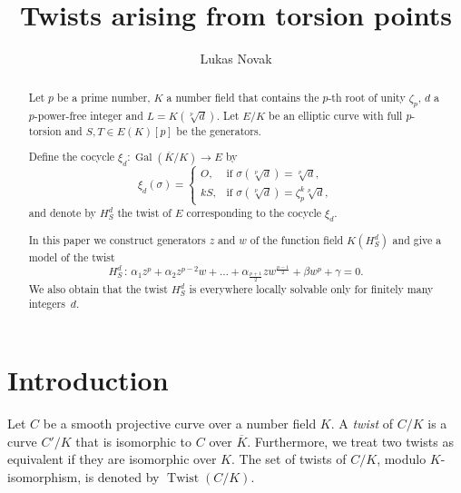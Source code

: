 \documentclass[a4paper, 12pt]{amsart}
\author{Lukas Novak}
\title[Twists arising from torsion points]{Twists arising from torsion points}
\theoremstyle{definition}
\theoremstyle{remark}
\numberwithin{equation}{section}
\begin{document}

\begin{abstract}
    Let $p$ be a prime number, $K$ a number field that contains the $p$-th root of unity $\zeta_p$, $d$ a $p$-power-free integer and $L=K(\sqrt[p]{d})$. Let $E/K$ be an elliptic curve with full $p$-torsion and $S,T \in E(K)[p]$ be the generators. 

    Define the cocycle $\xi_d : \operatorname{Gal}(\overline{K}/K) \to E$ by
    \[
        \xi_d (\sigma)=
        \begin{cases}
            O, & \text{if } \sigma(\sqrt[p]{d})=\sqrt[p]{d}, \\
            kS, & \text{if } \sigma(\sqrt[p]{d})=\zeta_p^k\sqrt[p]{d},
        \end{cases}
    \]
    and denote by $H_S^d$ the twist of $E$ corresponding to the cocycle $\xi_d$.

    In this paper we construct generators $z$ and $w$ of the function field $K(H_S^d)$ and give a model of the twist 
    \[
        H_S^d\,:\, \alpha_{1}z^p+\alpha_2z^{p-2}w+\dotso+\alpha_{\frac{p+1}{2}}zw^{\frac{p-1}{2}}+\beta w^p+\gamma=0.
    \]
    We also obtain that the twist $H_S^d$ is everywhere locally
    solvable only for finitely many integers~$d$.
\end{abstract}

\maketitle

\tableofcontents

\section{Introduction}\label{sec:1}

Let $C$ be a smooth projective curve over a number field $K$. A \emph{twist} of $C/K$ is a curve $C'/K$ that is isomorphic to $C$ over $\overline{K}$. Furthermore,  we treat two twists as equivalent if they are isomorphic over $K$. The set of twists of $C/K$, modulo $K$-isomorphism, is denoted by $\operatorname{Twist}(C/K)$.
\end{document}
